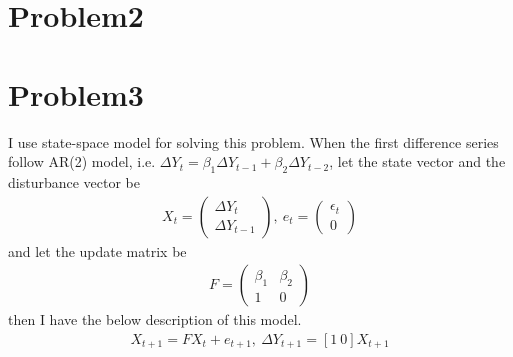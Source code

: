 \documentclass{article}
\begin{document}
\section{Problem2}


\section{Problem3}
 I use state-space model for solving this problem. When the first difference series follow AR(2) model, i.e. $\Delta Y_t = \beta_1 \Delta Y_{t-1}+ \beta_2 \Delta Y_{t-2}$, let the state vector and the disturbance vector be
 \begin{align*}
 	X_t = \begin{pmatrix}
	\Delta Y_t \\
	\Delta Y_{t-1}
	\end{pmatrix},\ 
	e_{t} = \begin{pmatrix}
	\epsilon_{t}\\
	0
	\end{pmatrix}
 \end{align*}
 and let the update matrix be
 \begin{align*}
 	F = \begin{pmatrix}
	\beta_1 & \beta_2\\
	1 & 0
	\end{pmatrix}
 \end{align*}
then I have the below description of this model.
\begin{align*}
	X_{t+1} = F X_t + e_{t+1},\ \Delta Y_{t+1} = [1\ 0] X_{t+1}
\end{align*}
\end{document}
